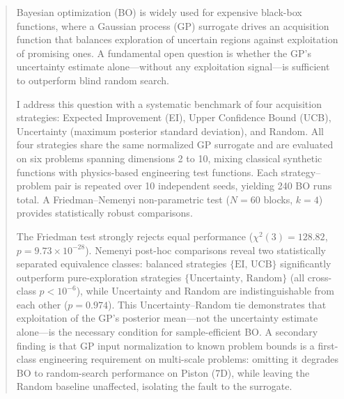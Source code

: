 \begin{abstract}
Bayesian optimization (BO) is widely used for expensive black-box
functions, where a Gaussian process (GP) surrogate drives an acquisition
function that balances exploration of uncertain regions against
exploitation of promising ones.
A fundamental open question is whether the GP's uncertainty estimate
alone—without any exploitation signal—is sufficient to outperform blind
random search.

I address this question with a systematic benchmark of four acquisition
strategies: Expected Improvement (EI), Upper Confidence Bound (UCB),
Uncertainty (maximum posterior standard deviation), and Random.
All four strategies share the same normalized GP surrogate and are
evaluated on six problems spanning dimensions 2 to 10, mixing classical
synthetic functions with physics-based engineering test functions.
Each strategy–problem pair is repeated over 10 independent seeds,
yielding 240 BO runs total.
A Friedman–Nemenyi non-parametric test ($N = 60$ blocks, $k = 4$)
provides statistically robust comparisons.

The Friedman test strongly rejects equal performance
($\chi^2(3) = 128.82$, $p = 9.73 \times 10^{-28}$).
Nemenyi post-hoc comparisons reveal two statistically separated
equivalence classes: balanced strategies $\{\text{EI, UCB}\}$
significantly outperform pure-exploration strategies
$\{\text{Uncertainty, Random}\}$ (all cross-class $p < 10^{-6}$),
while Uncertainty and Random are indistinguishable from each other
($p = 0.974$).
This Uncertainty–Random tie demonstrates that exploitation of the GP's
posterior mean—not the uncertainty estimate alone—is the necessary
condition for sample-efficient BO.
A secondary finding is that GP input normalization to known problem
bounds is a first-class engineering requirement on multi-scale problems:
omitting it degrades BO to random-search performance on Piston (7D),
while leaving the Random baseline unaffected, isolating the fault to
the surrogate.
\end{abstract}
